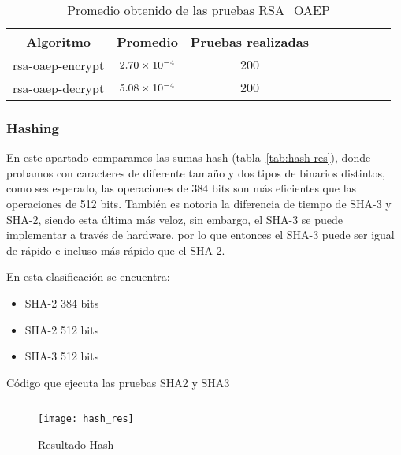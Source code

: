 \documentclass[../main.tex]{subfiles}
\begin{document}
\begin{table}[ht]
  \scriptsize
  \centering
  \caption{Promedio obtenido de las pruebas RSA\_OAEP}\label{tab:hash-prom}
  \begin{tabular}{|c|c|c|c|c|c|c|c|c|}
    \hline
    \rowcolor[HTML]{000000}
    {\color[HTML]{FFFFFF} Algoritmo} &
  {\color[HTML]{FFFFFF} Promedio} &
  {\color[HTML]{FFFFFF} Pruebas realizadas} \\ \hline
    rsa-oaep-encrypt  & $\num{2.70E-04}$ & $\num{200}$ \\ \hline
    \rowcolor[HTML]{C0C0C0}
    rsa-oaep-decrypt & $\num{5.08E-04}$ & $\num{200}$ \\ \hline
  \end{tabular}
\end{table}


\subsubsection{Hashing}\label{sec:hash}

En este apartado comparamos las sumas hash (tabla~\ref{tab:hash-res}), donde probamos con caracteres de diferente tamaño
y dos tipos de binarios distintos, como ses esperado, las operaciones de 384 bits son más eficientes
que las operaciones de 512 bits. También es notoria la diferencia de tiempo de SHA-3 y SHA-2, siendo esta
última más veloz, sin embargo, el SHA-3 se puede implementar a través de hardware, por lo que
entonces el SHA-3 puede ser igual de rápido e incluso más rápido que el SHA-2.

En esta clasificación se encuentra:
\begin{itemize}
  \item SHA-2 384 bits
  \item SHA-2 512 bits
  \item SHA-3 512 bits
\end{itemize}
\begin{code}
  \caption{Código que ejecuta las pruebas SHA2 y SHA3}\label{sec:hashing}
  \inputminted[lastline=56]{python}{../src/test_algoritmos_crypto/SHATests.py}
\end{code}

\begin{figure}[ht]
  \centering
  \texttt{[image: hash\_res]}
  \caption{Resultado Hash}\label{fig:hash}
\end{figure}
\end{document}
